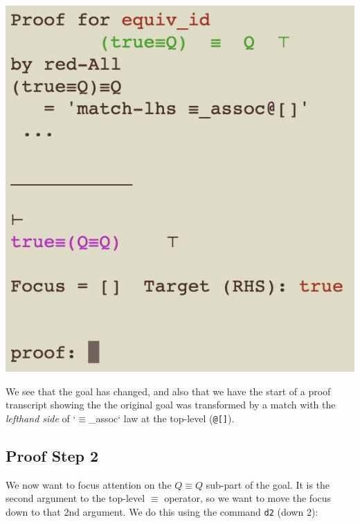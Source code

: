 \documentclass[11pt]{article}
\begin{document}
\includegraphics[scale=0.75]{doc/images/2-a1.png}

We see that the goal has changed, 
and also that we have the start of a proof transcript showing the the original goal was transformed by a match with the \emph{lefthand side} of `$\equiv$\_assoc` law at the top-level
(\verb"@[]").

\newpage
\subsection{Proof Step 2}

We now want to focus attention on the $Q\equiv Q$ sub-part of the goal.
It is the second argument to the top-level $\equiv$ operator, so we want to move the focus down to that 2nd argument.
We do this using the command \verb"d2" (down 2):
\end{document}

